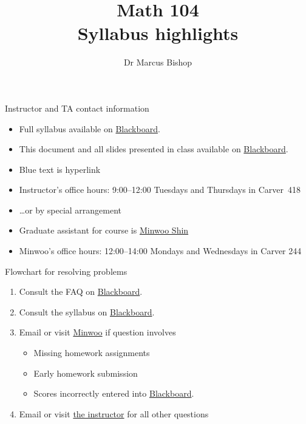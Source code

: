 \documentclass[xcolor=dvipsnames]{beamer}
\title[Syllabus highlights]{Math 104\\Syllabus highlights}
\author{Dr Marcus Bishop}
\theoremstyle{definition}
\begin{document}
\begin{frame}\titlepage\end{frame}
\LogoOff

\begin{frame}{Instructor and TA contact information}
\begin{itemize}
\item Full syllabus available on
\href{https://bb.its.iastate.edu}{\color{blue} Blackboard}.
\item This document and all slides presented in class
available on
\href{https://bb.its.iastate.edu}{\color{blue} Blackboard}.
\item Blue text is hyperlink
\item Instructor's office hours:
9:00--12:00 Tuesdays and Thursdays in Carver~418
\item \dots or by special arrangement
\item Graduate assistant for course is
\href{mailto:mws@iastate.edu}{\color{blue} Minwoo Shin}
\item Minwoo's office hours:
12:00--14:00 Mondays and Wednesdays in Carver 244
\end{itemize}
\end{frame}

\begin{frame}{Flowchart for resolving problems}
\begin{enumerate}
\item Consult the FAQ on
\href{https://bb.its.iastate.edu}{\color{blue} Blackboard}.
\item Consult the syllabus on
\href{https://bb.its.iastate.edu}{\color{blue} Blackboard}.
\item Email or visit \href{mailto:mws@iastate.edu}{\color{blue}Minwoo}
if question involves
\begin{itemize}
\item Missing homework assignments
\item Early homework submission
\item Scores incorrectly entered into
\href{https://bb.its.iastate.edu}{\color{blue} Blackboard}.
\end{itemize}
\item Email or visit \href{mailto:mbishop@iastate.edu}{\color{blue}the instructor}
for all other questions
\end{enumerate}
\end{frame}
\end{document}
